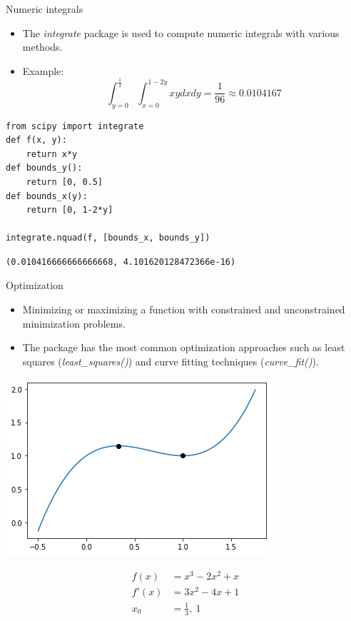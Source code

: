 \documentclass{beamer}
\begin{document}
\begin{frame}[fragile]{Numeric integrals}
\begin{itemize}
    \item The \emph{integrate} package is used to compute numeric integrals with various methods.
\item Example:
    \begin{equation}\nonumber
        \int_{y=0}^\frac{1}{2}
\int _{x=0}^{1-2y} xydxdy = \frac{1}{96}\approx 0.0104167    \end{equation}
\end{itemize}

\begin{lstlisting}
from scipy import integrate
def f(x, y):
    return x*y
def bounds_y():
    return [0, 0.5]
def bounds_x(y):
    return [0, 1-2*y]

integrate.nquad(f, [bounds_x, bounds_y])
\end{lstlisting}

\begin{verbatim}
(0.010416666666666668, 4.101620128472366e-16)
\end{verbatim}
\end{frame}






\begin{frame}[fragfile]{Optimization}
\begin{itemize}
    \item Minimizing or maximizing a function with constrained and unconstrained minimization problems. \item The package has the most common optimization approaches such as least squares (\emph{least\_squares()}) and curve fitting techniques (\emph{curve\_fit()}).
\end{itemize}
\begin{multicols}{2}
\includegraphics[scale=0.5]{Module 3 (Python tools)/pics/curve.png}

\begin{equation}\nonumber
\begin{split}
    f(x)&=x^3-2x^2+x\\
    f'(x) & = 3x^2-4x+1\\
    x_0&=\frac{1}{3}, ~1
\end{split}
\end{equation}
\end{multicols}
\end{frame}
\end{document}
